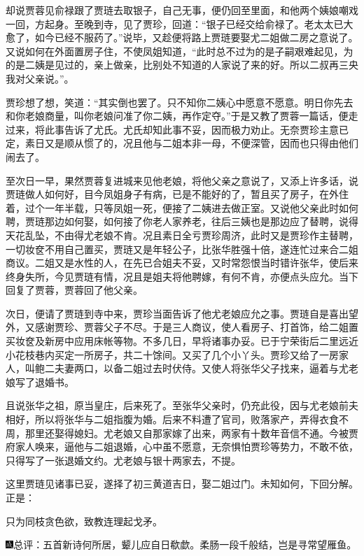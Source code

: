 却说贾蓉见俞禄跟了贾琏去取银子，自己无事，便仍回至里面，和他两个姨娘嘲戏一回，方起身。至晚到寺，见了贾珍，回道：``银子已经交给俞禄了。老太太已大愈了，如今已经不服药了。''说毕，又趁便将路上贾琏要娶尤二姐做二房之意说了。又说如何在外面置房子住，不使凤姐知道，``此时总不过为的是子嗣艰难起见，为的是二姨是见过的，亲上做亲，比别处不知道的人家说了来的好。所以二叔再三央我对父亲说。''。

贾珍想了想，笑道：``其实倒也罢了。只不知你二姨心中愿意不愿意。明日你先去和你老娘商量，叫你老娘问准了你二姨，再作定夺。''于是又教了贾蓉一篇话，便走过来，将此事告诉了尤氏。尤氏却知此事不妥，因而极力劝止。无奈贾珍主意已定，素日又是顺从惯了的，况且他与二姐本非一母，不便深管，因而也只得由他们闹去了。

至次日一早，果然贾蓉复进城来见他老娘，将他父亲之意说了，又添上许多话，说贾琏做人如何好，目今凤姐身子有病，已是不能好的了，暂且买了房子，在外住着，过个一年半载，只等凤姐一死，便接了二姨进去做正室。又说他父亲此时如何聘，贾琏那边如何娶，如何接了你老人家养老，往后三姨也是那边应了替聘，说得天花乱坠，不由得尤老娘不肯。况且素日全亏贾珍周济，此时又是贾珍作主替聘，一切妆奁不用自己置买，贾琏又是年轻公子，比张华胜强十倍，遂连忙过来合二姐商议。二姐又是水性的人，在先已合姐夫不妥，又时常怨恨当时错许张华，使后来终身失所，今见贾琏有情，况且是姐夫将他聘嫁，有何不肯，亦便点头应允。当下回复了贾蓉，贾蓉回了他父亲。

次日，便请了贾琏到寺中来，贾珍当面告诉了他尤老娘应允之事。贾琏自是喜出望外，又感谢贾珍、贾蓉父子不尽。于是三人商议，使人看房子、打首饰，给二姐置买妆奁及新房中应用床帐等物。不多几日，早将诸事办妥。已于宁荣街后二里远近小花枝巷内买定一所房子，共二十馀间。又买了几个小丫头。贾珍又给了一房家人，叫鲍二夫妻两口，以备二姐过去时伏侍。又使人将张华父子找来，逼着与尤老娘写了退婚书。

且说张华之祖，原当皇庄，后来死了。至张华父亲时，仍充此役，因与尤老娘前夫相好，所以将张华与二姐指腹为婚。后来不料遭了官司，败落家产，弄得衣食不周，那里还娶得媳妇。尤老娘又自那家嫁了出来，两家有十数年音信不通。今被贾府家人唤来，逼他与二姐退婚，心中虽不愿意，无奈惧怕贾珍等势力，不敢不依，只得写了一张退婚文约。尤老娘与银十两家去，不提。

这里贾琏见诸事已妥，遂择了初三黄道吉日，娶二姐过门。未知如何，下回分解。正是：

只为同枝贪色欲，致教连理起戈矛。

{\includegraphics[width=3mm]{../Images/00005}\kaishu 总评：五首新诗何所居，颦儿应自日欷}歔{。柔肠一段千般结，岂是寻常望雁鱼。}

